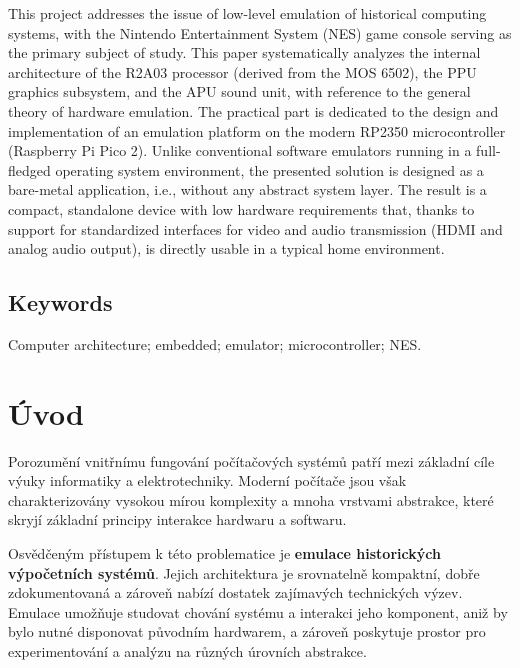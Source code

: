 \documentclass{soc}
\begin{document}
This project addresses the issue of low-level emulation of historical computing systems, with the
Nintendo Entertainment System (NES) game console serving as the primary subject of study. This paper
systematically analyzes the internal architecture of the R2A03 processor (derived from the MOS
6502), the PPU graphics subsystem, and the APU sound unit, with reference to the general theory of
hardware emulation. The practical part is dedicated to the design and implementation of an emulation
platform on the modern RP2350 microcontroller (Raspberry Pi Pico 2). Unlike conventional software
emulators running in a full-fledged operating system environment, the presented solution is designed
as a bare-metal application, i.e., without any abstract system layer. The result is a compact,
standalone device with low hardware requirements that, thanks to support for standardized interfaces
for video and audio transmission (HDMI and analog audio output), is directly usable in a typical
home environment.

\section*{Keywords}

Computer architecture; embedded; emulator; microcontroller; NES.

\newpage
\pagestyle{plain}

\tableofcontents

\setcounter{figure}{0}
\setcounter{table}{0}
\newpage



\newpage

\chapter*{Úvod}

Porozumění vnitřnímu fungování počítačových systémů patří mezi základní cíle výuky informatiky a
elektrotechniky. Moderní počítače jsou však charakterizovány vysokou mírou komplexity a mnoha
vrstvami abstrakce, které skryjí základní principy interakce hardwaru a softwaru.

Osvědčeným přístupem k této problematice je \textbf{emulace historických výpočetních systémů}.
Jejich architektura je srovnatelně kompaktní, dobře zdokumentovaná a zároveň nabízí dostatek
zajímavých technických výzev. Emulace umožňuje studovat chování systému a interakci jeho komponent,
aniž by bylo nutné disponovat původním hardwarem, a zároveň poskytuje prostor pro experimentování a
analýzu na různých úrovních abstrakce.
\end{document}
